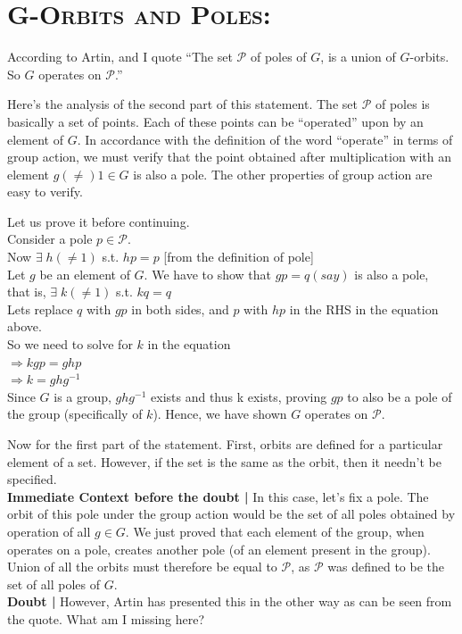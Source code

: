 \section{\textsc {G-Orbits and Poles: }}
 According to Artin, and I quote ``The set $\mathcal P$ of poles of $G$, is a union of $G$-orbits. So $G$ operates on $\mathcal P$.''
\par
Here's the analysis of the second part of this statement. The set $\mathcal P$ of poles is basically a set of points. Each of these points can be ``operated'' upon by an element of $G$. In accordance with the definition of the word ``operate'' in terms of group action, we must verify that the point obtained after multiplication with an element $g(\neq) 1 \in G$ is also a pole. The other properties of group action are easy to verify.
\par
Let us prove it before continuing.\\ Consider a pole $p \in \mathcal P$.\\
Now $\exists\;h(\neq 1)$ s.t. $hp=p$ \hfill [from the definition of pole]\\
Let $g$ be an element of $G$. We have to show that $gp=q (say)$ is also a pole,\\
that is, $\exists\;k(\neq 1)$ s.t. $kq=q$\\
Lets replace $q$ with $gp$ in both sides, and $p$ with $hp$ in the RHS in the equation above.\\
So we need to solve for $k$ in the equation\\
$\Rightarrow kgp=ghp$\\
$\Rightarrow k=ghg^{-1}$\\
Since $G$ is a group, $ghg^{-1}$ exists and thus k exists, proving $gp$ to also be a pole of the group (specifically of $k$). Hence, we have shown $G$ operates on $\mathcal P$.
\par
Now for the first part of the statement. First, orbits are defined for a particular element of a set. However, if the set is the same as the orbit, then it needn't be specified.\\
{\bf Immediate Context before the doubt | }
In this case, let's fix a pole. The orbit of this pole under the group action would be the set of all poles obtained by operation of all $g \in G$. We just proved that each element of the group, when operates on a pole, creates another pole (of an element present in the group). Union of all the orbits must therefore be equal to $\mathcal P$, as $\mathcal P$ was defined to be the set of all poles of $G$.\\
{\bf Doubt | }
However, Artin has presented this in the other way as can be seen from the quote. What am I missing here?\\

